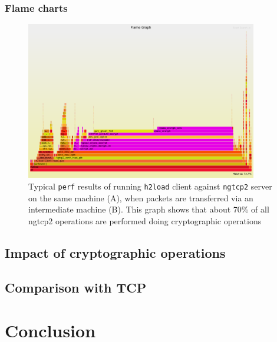 \documentclass[12pt,a4paper,twoside,openright]{report}
\begin{document}
\subsection{Flame charts}
    \begin{figure}[ht]
    \centering
    \includegraphics[width=0.9\textwidth]{figs/perf_results_of_h2load.png}
    \caption{Typical \texttt{perf} results of running \texttt{h2load} client against \texttt{ngtcp2} server on the same machine (A), when packets are transferred via an intermediate machine (B). This graph shows that about 70\% of all ngtcp2 operations are performed doing cryptographic operations} 
    \label{fig:perf_results_of_h2load}
    \end{figure}
    


\section{Impact of cryptographic operations}

\section{Comparison with TCP}



\chapter{Conclusion}
\end{document}
